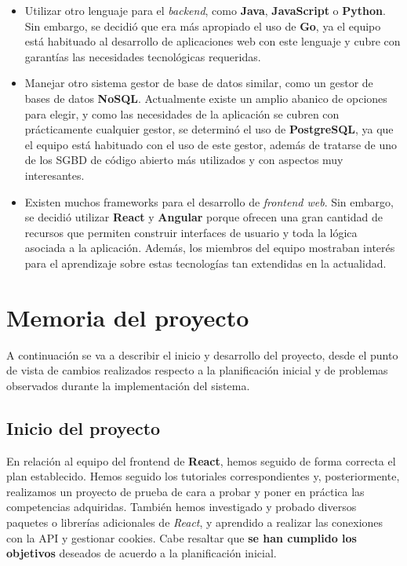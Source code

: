 \documentclass[11pt, a4paper, titlepage]{article}
\begin{document}
\begin{itemize}
    \item Utilizar otro lenguaje para el \textit{backend}, como \textbf{Java}, \textbf{JavaScript} o \textbf{Python}. Sin embargo, se decidió que era más apropiado el uso de \textbf{Go}, ya el equipo está habituado al desarrollo de aplicaciones web con este lenguaje y cubre con garantías las necesidades tecnológicas requeridas.

    \item  Manejar otro sistema gestor de base de datos similar, como un gestor de bases de datos \textbf{NoSQL}. Actualmente existe un amplio abanico de opciones para elegir, y como las necesidades de la aplicación se cubren con prácticamente cualquier gestor, se determinó el uso de \textbf{PostgreSQL}, ya que el equipo está habituado con el uso de este gestor, además de tratarse de uno de los SGBD de código abierto más utilizados y con aspectos muy interesantes.

    \item Existen muchos frameworks para el desarrollo de \textit{frontend web}. Sin embargo, se decidió utilizar  \textbf{React} y \textbf{Angular} porque ofrecen una gran cantidad de recursos que permiten construir interfaces de usuario y toda la lógica asociada a la aplicación. Además, los miembros del equipo mostraban interés para el aprendizaje sobre estas tecnologías tan extendidas en la actualidad.
\end{itemize}

\section{Memoria del proyecto}

A continuación se va a describir el inicio y desarrollo del proyecto, desde el punto de vista de cambios realizados respecto a la planificación inicial y de problemas observados durante la implementación del sistema.

\subsection{Inicio del proyecto}
En relación al equipo del frontend de \textbf{React}, hemos seguido de forma correcta el plan establecido. Hemos seguido los tutoriales correspondientes y, posteriormente, realizamos un proyecto de prueba de cara a probar y poner en práctica las competencias adquiridas. También hemos investigado y probado diversos paquetes o librerías adicionales de \textit{React}, y aprendido a realizar las conexiones con la API y gestionar cookies. Cabe resaltar que \textbf{se han cumplido los objetivos} deseados de acuerdo a la planificación inicial.
\end{document}
